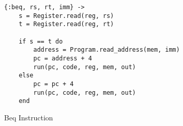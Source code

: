 \documentclass[a4paper,11pt]{article}
\begin{document}
\begin{figure}[H]
\begin{verbatim}
{:beq, rs, rt, imm} ->
    s = Register.read(reg, rs)
    t = Register.read(reg, rt)

    if s == t do
        address = Program.read_address(mem, imm)
        pc = address + 4
        run(pc, code, reg, mem, out)
    else
        pc = pc + 4
        run(pc, code, reg, mem, out)
    end
\end{verbatim}
\caption{Beq Instruction}
\label{Figure:7}
\end{figure}
\end{document}
